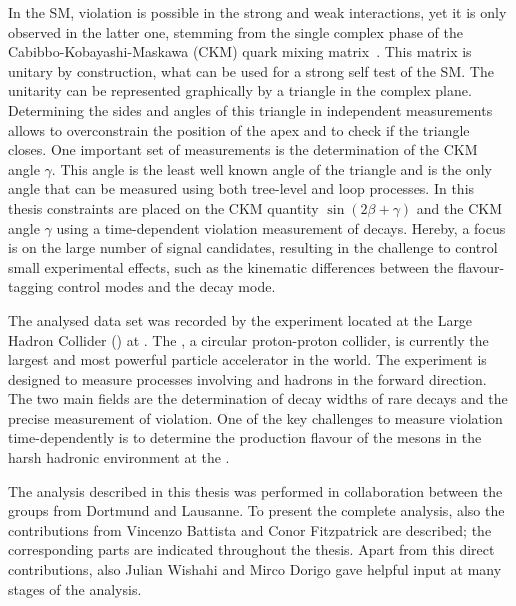 In the \ac{SM}, \CP violation is possible in the strong and weak interactions, yet it is only observed in the latter one, stemming from the single complex phase of the Cabibbo-Kobayashi-Maskawa (CKM) quark mixing matrix~\cite{Kobayashi:1973fv}.
This matrix is unitary by construction, what can be used for a strong self test of the \ac{SM}.
The unitarity can be represented graphically by a triangle in the complex plane.
Determining the sides and angles of this triangle in independent measurements allows to overconstrain the position of the apex and to check if the triangle closes.
One important set of measurements is the determination of the CKM angle $\gamma$.
This angle is the least well known angle of the triangle and is the only angle that can be measured using both tree-level and loop processes.
In this thesis constraints are placed on the CKM quantity $\sin\!\left(2\beta+\gamma\right)$ and the CKM angle $\gamma$ using a time-dependent \CP violation measurement of \BdToDpi decays.
Hereby, a focus is on the large number of signal candidates, resulting in the challenge to control small experimental effects, such as the kinematic differences between the flavour-tagging control modes and the \BdToDpi decay mode.

The analysed data set was recorded by the \lhcb experiment located at the Large Hadron Collider (\lhc) at \cern.
The \lhc, a circular proton-proton collider, is currently the largest and most powerful particle accelerator in the world.
The \lhcb experiment is designed to measure processes involving \bquark and \cquark hadrons in the forward direction.
The two main fields are the determination of decay widths of rare \B decays and the precise measurement of \CP violation.
One of the key challenges to measure \CP violation time-dependently is to determine the production flavour of the \B mesons in the harsh hadronic environment at the \lhc.

The analysis described in this thesis was performed in collaboration between the \lhcb groups from Dortmund and Lausanne.
To present the complete analysis, also the contributions from Vincenzo Battista and Conor Fitzpatrick are described; the corresponding parts are indicated throughout the thesis.
Apart from this direct contributions, also Julian Wishahi and Mirco Dorigo gave helpful input at many stages of the analysis.

